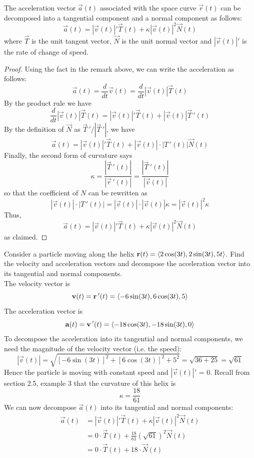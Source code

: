 \documentclass[handout]{ximera}
\begin{document}
\begin{proposition}
The acceleration vector $\vec a(t)$ associated with the space curve $\vec r(t)$ can be decomposed into a tangential component and a normal component as follows:
\[
\vec a(t) = |\vec v(t)|' \vec T(t) + \kappa |\vec v(t)|^2 \vec N(t)
\]
where $\vec T$ is the unit tangent vector, $\vec N$ is the unit normal vector and $|\vec v(t)|'$ is the rate of change of speed.
\end{proposition}
\begin{proof}
Using the fact in the remark above, we can write the acceleration as follows:
\[
\vec a(t) = \frac{d}{dt} \vec v(t) =  \frac{d}{dt} |\vec v(t)| \vec T(t)
\]
By the product rule we have
\[
\frac{d}{dt} |\vec v(t)| \vec T(t) = |\vec v(t)|' \vec T(t) + |\vec v(t)| \vec T\,'(t)
\]
By the definition of $\vec N$ as $\vec T\,' / |\vec T\,'|$, we have
\[
\vec a(t) = |\vec v(t)|' \vec T(t) + |\vec v(t)|\cdot |T\,'(t)| \vec N(t)
\]
Finally, the second form of curvature says
\[
\kappa = \frac{|\vec T\,'(t)|}{|\vec r\,'(t)|} = \frac{|\vec T\,'(t)|}{|\vec v(t)|}
\]
so that the coefficient of $N$ can be rewritten as
\[
|\vec v(t)|\cdot |T\,'(t)| = |\vec v(t)|\cdot |\vec v(t)| \kappa = |\vec v(t)|^2 \kappa
\]
Thus,
\[
\vec a(t) = |\vec v(t)|' \vec T(t) + \kappa |\vec v(t)|^2 \vec N(t)
\]
as claimed.
\end{proof}


\begin{example}[Example 5]
Consider a particle moving along the helix $\mathbf r(t) =  \left\langle 2\cos(3t), 2\sin(3t), 5t\right\rangle$.
Find the velocity and acceleration vectors and decompose the acceleration vector into its tangential and normal components.\\
The velocity vector is
\[
\mathbf v(t) = \mathbf r\,'(t) = \left\langle -6\sin(3t), 6\cos(3t), 5\right\rangle
\]
The acceleration vector is
\[
\mathbf a(t) = \mathbf v\,'(t) = \left\langle -18\cos(3t), -18\sin(3t), 0\right\rangle
\]
To decompose the acceleration into its tangential and normal components, we need the magnitude of the velocity vector (i.e. the speed):
\[
|\vec v(t)| = \sqrt{[-6\sin(3t)]^2 + [6\cos(3t)]^2 + 5^2} = \sqrt{36 + 25} = \sqrt{61}
\]
Hence the particle is moving with constant speed and $|\vec v(t)|'$ = 0.
Recall from section 2.5, example 3 that the curvature of this helix is
\[
\kappa = \frac{18}{61}
\]
We can now decompose $\vec a(t)$ into its tangential and normal components:
\begin{align*}
\vec a(t) &= |\vec v(t)|' \vec T(t) + \kappa |\vec v(t)|^2 \vec N(t) \\
          &= 0\cdot \vec T(t) + \frac{18}{61} \left(\sqrt{61}\right)^2 \vec N(t) \\
          &= 0 \cdot \vec T(t) + 18\cdot \vec N(t)\\
\end{align*}

\end{example}
\end{document}
